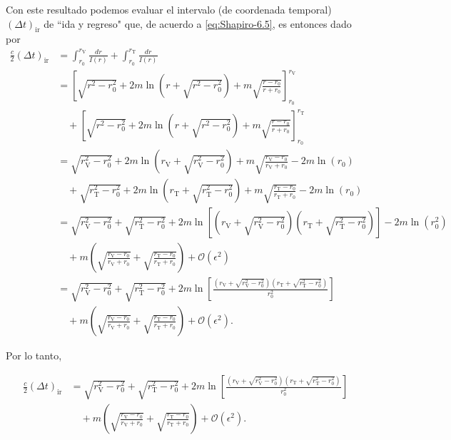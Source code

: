 \documentclass[letterpaper,11pt]{article}
\begin{document}
Con este resultado podemos evaluar el intervalo (de coordenada temporal) $(\Delta t)_{\text{ir}}$ de ``ida y regreso" que, de acuerdo a \eqref{eq:Shapiro-6.5}, es entonces dado por
\begin{align}
\frac{c}{2} (\Delta t)_{\text{ir}} &= \int_{r_0}^{r_{\text{V}}} \frac{dr}{I(r)} + \int_{r_0}^{r_{\text{T}}} \frac{dr}{I(r)} \nonumber \\
&= \left[\sqrt{r^2 - r_0^2} + 2m \ln\left(r+ \sqrt{r^2-r_0^2}\right) + m \sqrt{\frac{r-r_0}{r+r_0}} \right]_{r_0}^{r_{\text{V}}} \nonumber\\
& \quad + \left[\sqrt{r^2 - r_0^2} + 2m \ln\left(r+ \sqrt{r^2-r_0^2}\right) + m \sqrt{\frac{r-r_0}{r+r_0}} \right]_{r_0}^{r_{\text{T}}} \nonumber\\
&= \sqrt{r_{\text{V}}^2 - r_0^2} + 2m\ln\left(r_{\text{V}} + \sqrt{r_{\text{V}}^2 - r_0^2}\right) + m \sqrt{\frac{r_{\text{V}} - r_0}{r_{\text{V}} + r_0}} - 2m \ln(r_0) \nonumber\\
&\quad + \sqrt{r_{\text{T}}^2 - r_0^2} + 2m \ln\left(r_{\text{T}} + \sqrt{r_{\text{T}}^2 - r_0^2}\right) +  m \sqrt{\frac{r_{\text{T}} - r_0}{r_{\text{T}} + r_0}} - 2m \ln(r_0)\nonumber\\
&= \sqrt{r_{\text{V}}^2 - r_0^2} + \sqrt{r_{\text{T}}^2 - r_0^2} + 2m \ln\left[\left(r_{\text{V}} + \sqrt{r_{\text{V}}^2 - r_0^2}\right)\left(r_{\text{T}} + \sqrt{r_{\text{T}}^2 - r_0^2}\right)\right] - 2m \ln(r_0^2) \nonumber\\
&\quad + m \left(\sqrt{\frac{r_{\text{V}} - r_0}{r_{\text{V}} + r_0}} + \sqrt{\frac{r_{\text{T}} - r_0}{r_{\text{T}} + r_0}}\right) + \mathcal{O}(\epsilon^2) \nonumber\\
&= \sqrt{r_{\text{V}}^2 - r_0^2} + \sqrt{r_{\text{T}}^2 - r_0^2} + 2m \ln\left[\frac{\left(r_{\text{V}} + \sqrt{r_{\text{V}}^2 - r_0^2}\right)\left(r_{\text{T}} + \sqrt{r_{\text{T}}^2 - r_0^2}\right)}{r_0^2} \right] \nonumber\\
&\quad  + m \left(\sqrt{\frac{r_{\text{V}} - r_0}{r_{\text{V}} + r_0}} + \sqrt{\frac{r_{\text{T}} - r_0}{r_{\text{T}} + r_0}}\right) + \mathcal{O}(\epsilon^2).
\end{align}

Por lo tanto,
\begin{shaded}
\begin{align}
\frac{c}{2} (\Delta t)_{\text{ir}} &= \sqrt{r_{\text{V}}^2 - r_0^2} + \sqrt{r_{\text{T}}^2 - r_0^2} + 2m \ln\left[\frac{\left(r_{\text{V}} + \sqrt{r_{\text{V}}^2 - r_0^2}\right)\left(r_{\text{T}} + \sqrt{r_{\text{T}}^2 - r_0^2}\right)}{r_0^2} \right] \nonumber\\
&\quad  + m \left(\sqrt{\frac{r_{\text{V}} - r_0}{r_{\text{V}} + r_0}} + \sqrt{\frac{r_{\text{T}} - r_0}{r_{\text{T}} + r_0}}\right) + \mathcal{O}(\epsilon^2).
\end{align}
\end{shaded}
\end{document}
